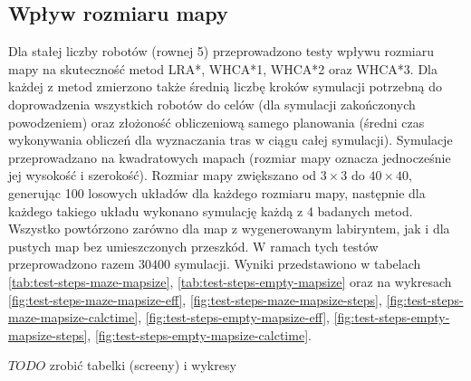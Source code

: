 \subsection{Wpływ rozmiaru mapy} %
\label{ch:tests-function-mapsize}
Dla stałej liczby robotów (rownej 5) przeprowadzono testy wpływu rozmiaru mapy na skuteczność metod LRA*, WHCA*1, WHCA*2 oraz WHCA*3.
Dla każdej z metod zmierzono także średnią liczbę kroków symulacji potrzebną do doprowadzenia wszystkich robotów do celów (dla symulacji zakończonych powodzeniem) oraz złożoność obliczeniową samego planowania (średni czas wykonywania obliczeń dla wyznaczania tras w ciągu całej symulacji).
Symulacje przeprowadzano na kwadratowych mapach (rozmiar mapy oznacza jednocześnie jej wysokość i szerokość).
Rozmiar mapy zwiększano od $3 \times 3$ do $40 \times 40$, generując 100 losowych układów dla każdego rozmiaru mapy, następnie dla każdego takiego układu wykonano symulację każdą z 4 badanych metod.
Wszystko powtórzono zarówno dla map z wygenerowanym labiryntem, jak i dla pustych map bez umieszczonych przeszkód.
W ramach tych testów przeprowadzono razem $30 400$ symulacji.
Wyniki przedstawiono w tabelach \ref{tab:test-steps-maze-mapsize}, \ref{tab:test-steps-empty-mapsize} oraz na wykresach \ref{fig:test-steps-maze-mapsize-eff}, \ref{fig:test-steps-maze-mapsize-steps}, \ref{fig:test-steps-maze-mapsize-calctime}, \ref{fig:test-steps-empty-mapsize-eff}, \ref{fig:test-steps-empty-mapsize-steps}, \ref{fig:test-steps-empty-mapsize-calctime}.

$TODO$ zrobić tabelki (screeny) i wykresy

